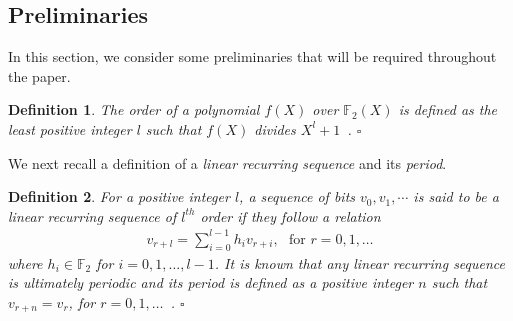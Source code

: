 \documentclass[10pt,journal]{IEEEtran}
\newtheorem{definition}{Definition}
\begin{document}
\subsection{Preliminaries}
% 
In this section, we consider some preliminaries that will be required throughout the paper.

% 
\begin{definition}
\label{Definition_order_fX}
%  
The order of a polynomial $f(X)$ over $\mathbb{F}_2(X)$ is defined as the least positive integer $l$ such that 
$f(X)$ divides $X^{l}+1$~\cite[Sec.~3.1]{Lidl86}.
% 
\hfill $\square$
% 
\end{definition}
% 

We next recall a definition of a \textit{linear recurring sequence} and its \textit{period}.
% 
\begin{definition}
\label{Definition_LRR}
%  
For a positive integer $l$, a sequence of bits $v_0, v_1, \cdots $ is said to be a linear recurring sequence of $l^{th}$ order 
if they follow a relation
% 
\begin{align}
%  
v_{r+l} = \sum_{i=0}^{l-1} h_{i} v_{r+i}, \mbox{~~for~} r = 0,1,\ldots
\label{Eqn_LRR_defi}
% 
\end{align}
% 
where $h_i \in \mathbb{F}_2$ for $i = 0,1,\ldots,l-1$.
It is known that any linear recurring sequence is ultimately periodic and its period is 
defined as a positive integer $n$ such that $v_{r+n} = v_{r}$, for $r = 0,1,\ldots$~\cite[Sec.~6.1]{Lidl86}.
% 
\hfill $\square$
% 
\end{definition}
% 
\end{document}

